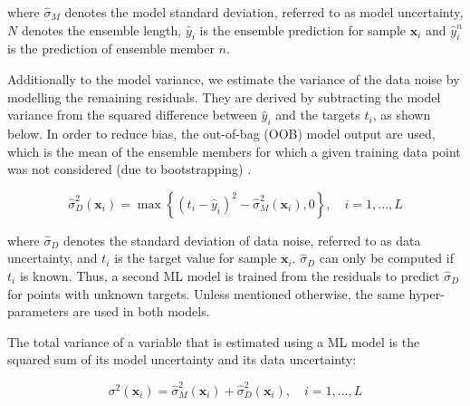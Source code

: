 where $\hat{\sigma}_M$ denotes the model standard deviation, referred to as model uncertainty, $N$ denotes the ensemble length, $\hat{y}_i$ is the ensemble prediction for sample $\mathbf{x}_i$ and $\hat{y}_i^n$ is the prediction of ensemble member $n$.

Additionally to the model variance, we estimate the variance of the data noise by modelling the remaining residuals. They are derived by subtracting the model variance from the squared difference between $\hat{y}_i$ and the targets $t_i$, as shown below.
In order to reduce bias, the out-of-bag (OOB) model output are used, which is the mean of the ensemble members for which a given training data point was not considered (due to bootstrapping) \cite{heskes_practical_1997}. 

\begin{equation}
\label{eq:data_unc}
  \hat{\sigma}_D^2 (\mathbf{x}_i) = \max \left\{ (t_i - \hat{y}_i)^2 - \hat{\sigma}_M^2 (\mathbf{x}_i) , 0 \right\}, \quad i=1,...,L
\end{equation}
 
 where $\hat{\sigma}_D$ denotes the standard deviation of data noise, referred to as data uncertainty, and $t_i$ is the target value for sample $\mathbf{x}_i$. 
$\hat{\sigma}_D$ can only be computed if $t_i$ is known. Thus, a second ML model is trained from the residuals to predict $\hat{\sigma}_D$ for points with unknown targets. Unless mentioned otherwise, the same hyper-parameters are used in both models.

The total variance of a variable that is estimated using a ML model is the squared sum of its model uncertainty and its data uncertainty: 

\begin{equation}
\label{eq:total_unc}
\sigma^2 (\mathbf{x}_i) = \hat{\sigma}_M^2 (\mathbf{x}_i) + \hat{\sigma}_D^2 (\mathbf{x}_i), \quad i=1,...,L
\end{equation}


